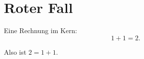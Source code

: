 \chapter{Roter Fall}\label{c99}

Eine Rechnung im Kern:
\begin{equation}\label{c99.eq.eins}
  1 + 1 = 2.
\end{equation}
\begin{corollary}\label{c99.cor.zwei}
  Also ist $2 = 1 + 1$.
\end{corollary}
